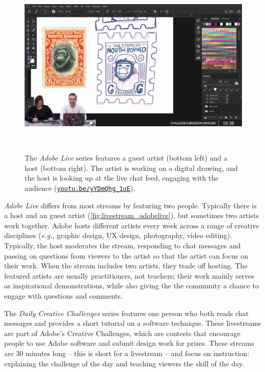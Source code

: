 \begin{figure}[b]
\vspace{-0.1in}
\centering
  \includegraphics[width=1\columnwidth]{livestreams/figures/adobelive.png}
  \caption{The \textit{Adobe Live} series features a guest artist (bottom left) and a host (bottom right). The artist is working on a digital drawing, and the host is looking up at the live chat feed, engaging with the audience (\href{https://youtu.be/yYDmQhg_1uE}{\nolinkurl{youtu.be/yYDmQhg_1uE}}). }~\label{fig:livestream_adobelive}
  \vspace{-0.2in}
\end{figure}

\textit{Adobe Live} differs from most streams by featuring two people. Typically there is a host and an guest artist (\autoref{fig:livestream_adobelive}), but sometimes two artists work together. Adobe hosts different artists every week across a range of creative disciplines (\textit{e.g.,} graphic design, UX design, photography, video editing). Typically, the host moderates the stream, responding to chat messages and passing on questions from viewers to the artist so that the artist can focus on their work. When the stream includes two artists, they trade off hosting.
The featured artists are usually practitioners, not teachers; their work mainly serves as inspirational demonstrations, while also giving the the community a chance to engage with questions and comments. 

The \textit{Daily Creative Challenges} series features one person who both reads chat messages and provides a short tutorial on a software technique. These livestreams are part of Adobe's Creative Challenges, which are contests that encourage people to use Adobe software and submit design work for prizes\footnotemark. These streams are 30 minutes long -- this is short for a livestream -- and focus on instruction: explaining the challenge of the day and teaching viewers the skill of the day. 

